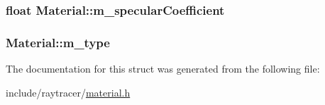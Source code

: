 \subsubsection[{m\+\_\+specular\+Coefficient}]{\setlength{\rightskip}{0pt plus 5cm}float Material\+::m\+\_\+specular\+Coefficient}\label{structMaterial_aecf39c59a7f6010888fa3095fc013a0f}
\hypertarget{structMaterial_a25bc4627b427de86ba7ca89ce3dc883f}{}
\subsubsection[{m\+\_\+type}]{ Material\+::m\+\_\+type}\label{structMaterial_a25bc4627b427de86ba7ca89ce3dc883f}


The documentation for this struct was generated from the following file\+:\begin{DoxyCompactItemize}
\item 
include/raytracer/\hyperlink{material_8h}{material.\+h}\end{DoxyCompactItemize}
